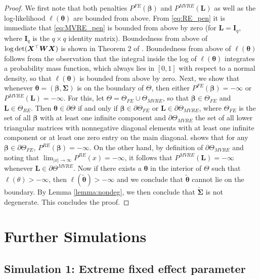 \documentclass[11pt, a4paper]{article}
\newcommand*{\bb}{\boldsymbol}
\theoremstyle{example} \newtheorem{example}{Example}[section]
\theoremstyle{theorem} \newtheorem{theorem}{Theorem}[section]
\theoremstyle{theorem }\newtheorem{proposition}{Proposition}[section]
\theoremstyle{theorem }\newtheorem{corollary}{Corollary}[section]
\def\det{{\mathop{\rm det}}}
\def\btheta{\bb{\theta}}
\def\bSigma{\bb{\Sigma}}
\def\bX{\bb{X}}
\def\bL{\bb{L}}
\def\bttilde{\tilde{\bb{\theta}}}
\def\bW{\bb{W}}
\begin{document}
\begin{proof}
	We first note that both penalties $P^\textit{FE}(\bb \beta)$ and $P^\textit{MVRE}(\bb L)$ as well as the log-likelihood $\ell(\bb \theta)$ are bounded from above. From \eqref{eq:RE_pen} it is immediate that \eqref{eq:MVRE_pen} is bounded from above by zero (for $\bb L= {\bb I}_q$, where ${\bb I}_q$ is the $q\times q$ identity matrix). Boundedness from above of $\log \det(\bX^\top \bW \bX)$ is shown in Theorem 2 of \citet{kosmidis+firth:2020}. Boundedness from above of $\ell(\bb \theta)$ follows from the observation that the integral inside the log of $\ell(\bb \theta)$ integrates a probability mass function, which always lies in $[0,1]$ with respect to a normal density, so that $\ell(\bb \theta)$ is bounded from above by zero. Next, we show that whenever $\btheta =(\bb \beta,\bSigma)$ is on the boundary of $\Theta$, then either $P^\textit{FE}(\bb \beta) = - \infty$ or $P^\textit{MVRE}(\bL) = -\infty$. For this, let $\Theta = \Theta_\textit{FE} \cup \Theta_\textit{MVRE}$, so that $\bb \beta \in \Theta_\textit{FE}$ and $\bL \in \Theta_\textit{RE}$. Then $\btheta \in \partial \Theta$ if and only if $\bb \beta \in \partial \Theta_\textit{FE} $ or $ \bL \in \partial \Theta_\textit{MVRE}$, where $\Theta_\textit{FE}$ is the set of all $\bb \beta$ with at least one infinite component and $\partial \Theta_\textit{MVRE}$ the set of all lower triangular matrices with nonnegative diagonal elements with at least one infinite component or at least one zero entry on the main diagonal. \citet{kosmidis+firth:2020} shows that for any $\bb{ \beta} \in \partial\Theta_\textit{FE}$, $P^\textit{RE}(\bb \beta) = -\infty$. On the other hand, by definition of $\partial \Theta_\textit{MVRE}$ and noting that $\lim_{|x| \to \infty} P^\textit{RE}(x) = - \infty $, it follows that $P^\textit{MVRE}(\bL)=-\infty$ whenever $\bL \in \partial \Theta^\textit{MVRE}$. Now if there exists a $\btheta$ in the interior of $\Theta$ such that $\ell(\theta)>-\infty$, then $\ell(\bttilde) >-\infty$ and we conclude that $\bttilde$ cannot lie on the boundary. By Lemma \ref{lemma:nondeg}, we then conclude that $\tilde{\bSigma}$ is not degenerate. This concludes the proof.
\end{proof} 

\section{Further Simulations} \label{sec:simuls}

\subsection{Simulation 1: Extreme fixed effect parameter}\label{sec:sim1}
\end{document}
